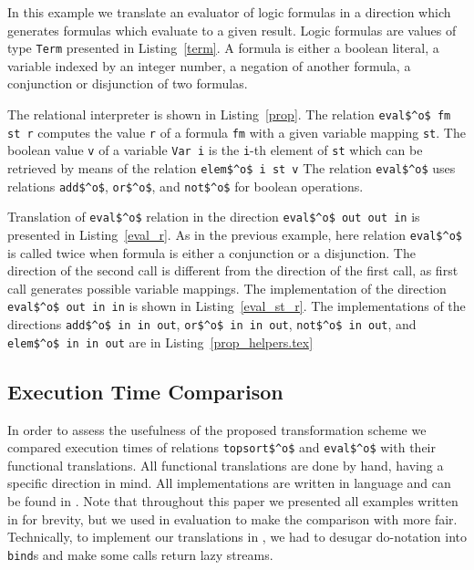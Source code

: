 

In this example we translate an evaluator of logic formulas in a direction which generates formulas which evaluate to a given result.
Logic formulas are values of type \lstinline{Term} presented in Listing~\ref{term}.
A formula is either a boolean literal, a variable indexed by an integer number, a negation of another formula, a conjunction or disjunction of two formulas.

The relational interpreter is shown in Listing~\ref{prop}.
The relation \lstinline{eval$^o$ fm st r} computes the value \lstinline{r} of a formula \lstinline{fm} with a given variable mapping \lstinline{st}.
The boolean value \lstinline{v} of a variable \lstinline{Var i} is the \lstinline{i}-th element of \lstinline{st} which can be retrieved by means of the relation \lstinline{elem$^o$ i st v}
The relation \lstinline{eval$^o$} uses relations \lstinline{add$^o$}, \lstinline{or$^o$}, and \lstinline{not$^o$} for boolean operations.

Translation of \lstinline{eval$^o$} relation in the direction \lstinline{eval$^o$ out out in} is presented in Listing~\ref{eval_r}.
As in the previous example, here relation \lstinline{eval$^o$} is called twice when formula is either a conjunction or a disjunction.
The direction of the second call is different from the direction of the first call, as first call generates possible variable mappings.
The implementation of the direction \lstinline{eval$^o$ out in in} is shown in Listing~\ref{eval_st_r}.
The implementations of the directions \lstinline{add$^o$ in in out}, \lstinline{or$^o$ in in out}, \lstinline{not$^o$ in out}, and \lstinline{elem$^o$ in in out} are in Listing~\ref{prop_helpers.tex}







\subsection{Execution Time Comparison}

In order to assess the usefulness of the proposed transformation scheme we compared execution times of \mk relations \lstinline{topsort$^o$} and \lstinline{eval$^o$} with their functional translations.
All functional translations are done by hand, having a specific direction in mind.
All implementations are written in \ocaml language and can be found in .
Note that throughout this paper we presented all examples written in \haskell for brevity, but we used \ocaml in evaluation to make the comparison with \ocanren more fair.
Technically, to implement our translations in \ocaml, we had to desugar \haskell do-notation into \lstinline{bind}s and make some calls return lazy streams.


